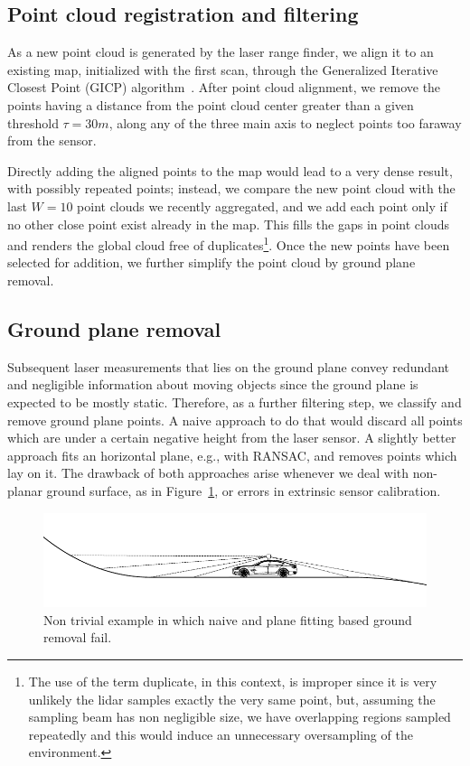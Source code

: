 \subsection{Point cloud registration and filtering}
As a new point cloud is generated by the laser range finder, we align it to an existing map, initialized with the first scan, through the Generalized Iterative Closest Point (GICP) algorithm~\cite{segal2009generalized}.
%
After point cloud alignment, we remove the points having a distance from the point cloud center greater than a given threshold $\tau = 30m$, along any of the three main axis to neglect points too faraway from the sensor.

Directly adding the aligned points to the map would lead to a very dense result, with possibly repeated points; instead, we compare the new point cloud with the last $W = 10$ 
point clouds we recently aggregated, and we add each point only if no other close point exist already in the map. This fills the gaps in point clouds and renders the global cloud free of duplicates\footnote{The use of the term duplicate, in this context, is improper since it is very unlikely the lidar samples exactly the very same point, but, assuming the sampling beam has non negligible size, we have overlapping regions sampled repeatedly and this would induce an unnecessary oversampling of the environment.}. Once the new points have been selected for addition, we further simplify the point cloud by ground plane removal.


\subsection{Ground plane removal}
\label{sec:ground_removal}
Subsequent laser measurements that lies on the ground plane convey redundant and negligible information about moving objects since the ground plane is expected to be mostly static. Therefore, as a further filtering step, we classify and remove ground plane points. 
A naive approach to do that would discard all points which are under a certain negative height from the laser sensor. 
A slightly better approach fits an horizontal plane, e.g., with RANSAC, and removes points which lay on it.
The drawback of both approaches arise whenever we deal with non-planar ground surface, as in Figure~\ref{fig:nonplane}, or errors in extrinsic sensor calibration.

\begin{figure}
\includegraphics[width=0.99\columnwidth]{./img/ch-laser/./non-plane}
\caption{Non trivial example in which naive and plane fitting based ground removal fail.}
\label{fig:nonplane}
\end{figure}

